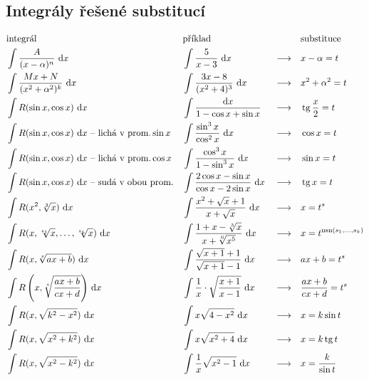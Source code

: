 \subsection*{Integrály řešené substitucí}
\begin{align*}
    &\textrm{integrál}                                & & \textrm{příklad}                                       & &                 & & \textrm{substituce}\\
    &\int \frac{A}{(x-\alpha)^n}\, \d x                 & & \int \frac{5}{x-3}\, \d x                                & & \longrightarrow & & x-\alpha=t \\
    &\int \frac{Mx+N}{(x^2+\alpha^2)^k}\, \d x          & & \int \frac{3x-8}{(x^2+4)^3}\, \d x                       & & \longrightarrow & & x^2+\alpha^2=t \\
    &\int R(\sin x, \cos x)\, \d x                      & & \int \frac{\d x}{1-\cos x+\sin x}                        & & \longrightarrow & & \tg \frac{x}{2}=t \\
    &\int R(\sin x, \cos x)\, \d x \textrm{ -- lichá v prom.}\sin x                                               & & \int \frac{\sin^3 x}{\cos^2 x}\, \d x                    & & \longrightarrow & & \cos x = t \\
    &\int R(\sin x, \cos x)\, \d x \textrm{ -- lichá v prom.}\cos x                                               & & \int \frac{\cos^3 x}{1-\sin^3 x}\, \d x                  & & \longrightarrow & & \sin x = t \\
    &\int R(\sin x, \cos x)\, \d x \textrm{ -- sudá v obou prom.} & & \int \frac{2\cos x - \sin x}{\cos x - 2\sin x} \, \d x   & & \longrightarrow & & \tg x = t \\
    &\int R(x^2,\sqrt[3]{x})\, \d x                     & & \int \frac{x^2+\sqrt{x}+1}{x+\sqrt{x}}\, \d x            & & \longrightarrow & & x=t^s \\
    &\int R(x,\sqrt[s_1]{x},\dots,\sqrt[s_k]{x})\, \d x & & \int \frac{1+x-\sqrt[3]{x}}{x+\sqrt[6]{x^5}}\, \d x      & & \longrightarrow & & x=t^{\textrm{nsn}(s_1,\dots,s_k)}\\
    &\int R(x,\sqrt[s]{ax+b})\, \d x                    & & \int \frac{\sqrt{x+1}+1}{\sqrt{x+1}-1} \, \d x           & & \longrightarrow & & ax+b=t^s \\
    &\int R\left(x,\sqrt[s]{\frac{ax+b}{cx+d}}\right)\, \d x       & & \int \frac{1}{x}\cdot \sqrt{\frac{x+1}{x-1}} \, \d x     & & \longrightarrow & & \frac{ax+b}{cx+d}=t^s \\
    &\int R(x,\sqrt{k^2-x^2}) \, \d x                   & & \int x \sqrt{4-x^2}\, \d x                               & & \longrightarrow & & x=k\sin t \\
    &\int R(x,\sqrt{x^2+k^2})\, \d x                    & & \int x \sqrt{x^2+4} \, \d x                              & & \longrightarrow & & x=k\tg t \\
    &\int R(x,\sqrt{x^2-k^2} )\, \d x                   & & \int \frac{1}{x}\sqrt{x^2-1}\, \d x                      & & \longrightarrow & & x=\frac{k}{\sin t}
\end{align*}

